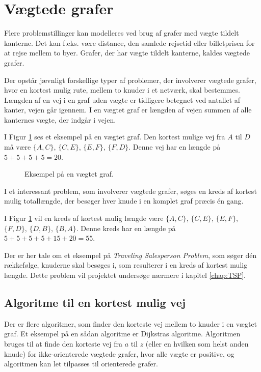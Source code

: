 \section{Vægtede grafer}

Flere problemstillinger kan modelleres ved brug af grafer med vægte tildelt kanterne. 
Det kan f.eks. være distance, den samlede rejsetid eller billetprisen for at rejse mellem to byer. 
Grafer, der har vægte tildelt kanterne, kaldes vægtede grafer. 

Der opstår jævnligt forskellige typer af problemer, der involverer vægtede grafer, hvor en kortest mulig rute, mellem to knuder i et netværk, skal bestemmes. 
Længden af en vej i en graf uden vægte er tidligere betegnet ved antallet af kanter, vejen går igennem.
I en vægtet graf er længden af vejen summen af alle kanternes vægte, der indgår i vejen.

\begin{exmp}
I Figur \ref{fig:weighted_graph} ses et eksempel på en vægtet graf. Den kortest mulige vej fra $A$ til $D$ må være $\lbrace A,C \rbrace$, $\lbrace C,E \rbrace$, $\lbrace E,F \rbrace$, $\lbrace F,D \rbrace$. Denne vej har en længde på $5+5+5+5=20$. 
\end{exmp}

\begin{figure}[h!]
	\centering
	
	\caption{Eksempel på en vægtet graf.} \label{fig:weighted_graph}
\end{figure}

I et interessant problem, som involverer vægtede grafer, søges en kreds af kortest mulig totallængde, der besøger hver knude i en komplet graf præcis én gang.

I Figur \ref{fig:weighted_graph} vil en kreds af kortest mulig længde være $\lbrace A,C \rbrace$, $\lbrace C,E \rbrace$, $\lbrace E,F \rbrace$, $\lbrace F,D \rbrace$, $\lbrace D,B \rbrace$, $\lbrace B,A \rbrace$.
Denne kreds har en længde på $5+5+5+5+15+20=55$.

Der er her tale om et eksempel på \emph{Traveling Salesperson Problem}, som søger dén rækkefølge, knuderne skal besøges i, som resulterer i en kreds af kortest mulig længde. 
Dette problem vil projektet undersøge nærmere i kapitel \ref{chap:TSP}.

\subsection{Algoritme til en kortest mulig vej}
Der er flere algoritmer, som finder den korteste vej mellem to knuder i en vægtet graf.
Et eksempel på en sådan algoritme er Dijkstras algoritme.
Algoritmen bruges til at finde den korteste vej fra $a$ til $z$ (eller en hvilken som helst anden knude) for ikke-orienterede vægtede grafer, hvor alle vægte er positive, og algoritmen kan let tilpasses til orienterede grafer.

